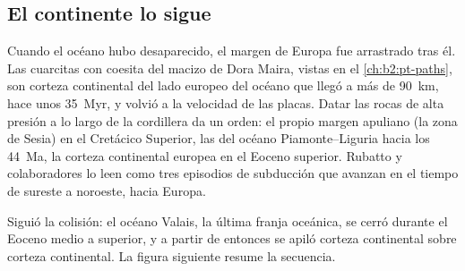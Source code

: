 \subsection*{El continente lo sigue}

Cuando el océano hubo desaparecido, el margen de Europa fue arrastrado tras él. Las cuarcitas con
coesita del macizo de Dora Maira, vistas en el \cref{ch:b2:pt-paths}, son corteza continental
del lado europeo del océano que llegó a más de \qty{90}{km}, hace unos
\qty{35}{Myr}, y volvió a la velocidad de las placas. Datar las rocas de alta presión
a lo largo de la cordillera da un orden: el propio margen apuliano (la zona de Sesia) en el Cretácico
Superior, las  del océano Piamonte--Liguria hacia los \qty{44}{Ma}, la
corteza continental europea en el Eoceno superior. Rubatto y colaboradores lo leen como tres episodios de subducción que avanzan en el tiempo de
sureste a noroeste, hacia Europa.

Siguió la colisión: el océano Valais, la última franja oceánica, se cerró durante el Eoceno medio a
superior, y a partir de entonces se apiló corteza continental sobre corteza continental.
La figura siguiente resume la secuencia.

